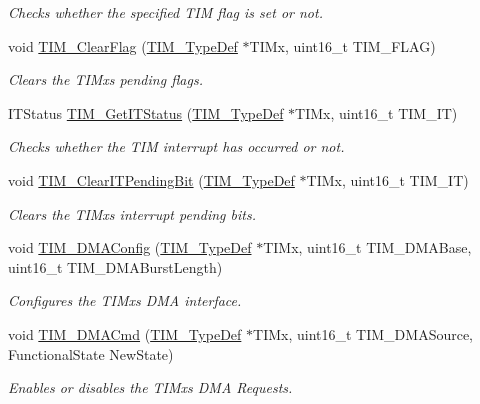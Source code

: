 \begin{DoxyCompactItemize}
\begin{DoxyCompactList}\small\item\em Checks whether the specified T\+IM flag is set or not. \end{DoxyCompactList}\item 
void \hyperlink{group___t_i_m_ga46568c7b254941dc53e785342d60baf3}{T\+I\+M\+\_\+\+Clear\+Flag} (\hyperlink{struct_t_i_m___type_def}{T\+I\+M\+\_\+\+Type\+Def} $\ast$T\+I\+Mx, uint16\+\_\+t T\+I\+M\+\_\+\+F\+L\+AG)
\begin{DoxyCompactList}\small\item\em Clears the T\+I\+Mx\textquotesingle{}s pending flags. \end{DoxyCompactList}\item 
I\+T\+Status \hyperlink{group___t_i_m_ga0827a0b411707304f76d33050727c24d}{T\+I\+M\+\_\+\+Get\+I\+T\+Status} (\hyperlink{struct_t_i_m___type_def}{T\+I\+M\+\_\+\+Type\+Def} $\ast$T\+I\+Mx, uint16\+\_\+t T\+I\+M\+\_\+\+IT)
\begin{DoxyCompactList}\small\item\em Checks whether the T\+IM interrupt has occurred or not. \end{DoxyCompactList}\item 
void \hyperlink{group___t_i_m_ga9eb1e95af71ed380f51a2c6d585cc5d6}{T\+I\+M\+\_\+\+Clear\+I\+T\+Pending\+Bit} (\hyperlink{struct_t_i_m___type_def}{T\+I\+M\+\_\+\+Type\+Def} $\ast$T\+I\+Mx, uint16\+\_\+t T\+I\+M\+\_\+\+IT)
\begin{DoxyCompactList}\small\item\em Clears the T\+I\+Mx\textquotesingle{}s interrupt pending bits. \end{DoxyCompactList}\item 
void \hyperlink{group___t_i_m_gad7156f84c436c8ac92cd789611826d09}{T\+I\+M\+\_\+\+D\+M\+A\+Config} (\hyperlink{struct_t_i_m___type_def}{T\+I\+M\+\_\+\+Type\+Def} $\ast$T\+I\+Mx, uint16\+\_\+t T\+I\+M\+\_\+\+D\+M\+A\+Base, uint16\+\_\+t T\+I\+M\+\_\+\+D\+M\+A\+Burst\+Length)
\begin{DoxyCompactList}\small\item\em Configures the T\+I\+Mx\textquotesingle{}s D\+MA interface. \end{DoxyCompactList}\item 
void \hyperlink{group___t_i_m_ga24700389cfa3ea9b42234933b23f1399}{T\+I\+M\+\_\+\+D\+M\+A\+Cmd} (\hyperlink{struct_t_i_m___type_def}{T\+I\+M\+\_\+\+Type\+Def} $\ast$T\+I\+Mx, uint16\+\_\+t T\+I\+M\+\_\+\+D\+M\+A\+Source, Functional\+State New\+State)
\begin{DoxyCompactList}\small\item\em Enables or disables the T\+I\+Mx\textquotesingle{}s D\+MA Requests. \end{DoxyCompactList}\item 

\end{DoxyCompactItemize}
